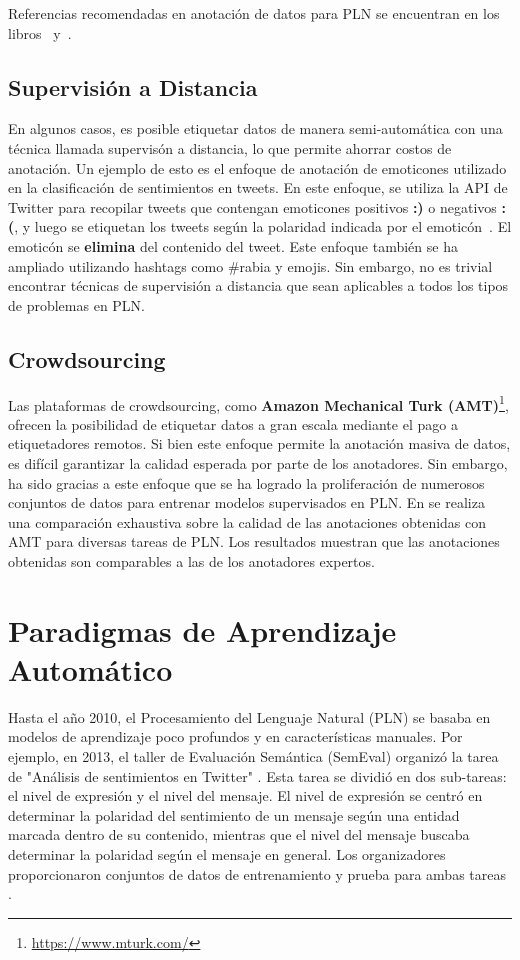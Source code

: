 Referencias recomendadas en anotación de datos para PLN se encuentran en los libros~\cite{fort2016collaborative} y~\cite{pustejovsky2012natural}.


\subsection{Supervisión a Distancia}

En algunos casos, es posible etiquetar datos de manera semi-automática con una técnica llamada supervisón a distancia, lo que permite ahorrar costos de anotación. Un ejemplo de esto es el enfoque de anotación de emoticones utilizado en la clasificación de sentimientos en tweets. En este enfoque, se utiliza la API de Twitter para recopilar tweets que contengan emoticones positivos \textcolor[rgb]{0.00,0.00,1.00}{\textbf{:)}} o negativos \textcolor[rgb]{1.00,0.00,0.00}{\textbf{:(}}, y luego se etiquetan los tweets según la polaridad indicada por el emoticón~\cite{Read2005}. El emoticón se \textbf{elimina} del contenido del tweet. Este enfoque también se ha ampliado utilizando hashtags como \#rabia y emojis. Sin embargo, no es trivial encontrar técnicas de supervisión a distancia que sean aplicables a todos los tipos de problemas en PLN.

\subsection{Crowdsourcing}
Las plataformas de crowdsourcing, como \textbf{Amazon Mechanical Turk (AMT)}\footnote{\url{https://www.mturk.com/}}, ofrecen la posibilidad de etiquetar datos a gran escala mediante el pago a etiquetadores remotos. Si bien este enfoque permite la anotación masiva de datos, es difícil garantizar la calidad esperada por parte de los anotadores. Sin embargo, ha sido gracias a este enfoque que se ha logrado la proliferación de numerosos conjuntos de datos para entrenar modelos supervisados en PLN. En \cite{snow2008cheap} se realiza una comparación exhaustiva sobre la calidad de las anotaciones obtenidas con AMT para diversas tareas de PLN.  Los resultados muestran que las anotaciones obtenidas son comparables a las de los anotadores expertos. 

\section{Paradigmas de Aprendizaje Automático}

Hasta el año 2010, el Procesamiento del Lenguaje Natural (PLN) se basaba en modelos de aprendizaje poco profundos y en características manuales. Por ejemplo, en 2013, el taller de Evaluación Semántica (SemEval) organizó la tarea de "Análisis de sentimientos en Twitter" \cite{Semeval2013}. Esta tarea se dividió en dos sub-tareas: el nivel de expresión y el nivel del mensaje. El nivel de expresión se centró en determinar la polaridad del sentimiento de un mensaje según una entidad marcada dentro de su contenido, mientras que el nivel del mensaje buscaba determinar la polaridad según el mensaje en general. Los organizadores proporcionaron conjuntos de datos de entrenamiento y prueba para ambas tareas \cite{Semeval2013}.


